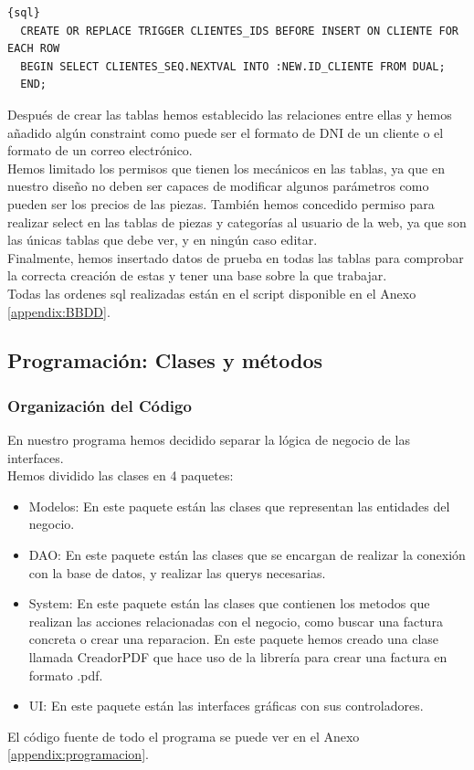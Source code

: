 \documentclass{article}
\begin{document}
{\begin{lstlisting}{sql}
  CREATE OR REPLACE TRIGGER CLIENTES_IDS BEFORE INSERT ON CLIENTE FOR EACH ROW
  BEGIN SELECT CLIENTES_SEQ.NEXTVAL INTO :NEW.ID_CLIENTE FROM DUAL;
  END;
\end{lstlisting}
Después de crear las tablas hemos establecido las relaciones entre ellas y hemos añadido algún constraint como puede ser el formato de DNI de un cliente o el formato de un correo electrónico.\\ 
Hemos limitado los permisos que tienen los mecánicos en las tablas, ya que en nuestro diseño no deben ser capaces de modificar algunos parámetros como pueden ser los precios de las piezas. También hemos concedido permiso para
realizar select en las tablas de piezas y categorías al usuario de la web, ya que son las únicas tablas que debe ver, y en ningún caso editar.\\ 
Finalmente, hemos insertado datos de prueba en todas las tablas para comprobar la correcta creación de estas y tener una base sobre la que trabajar.\\ 
Todas las ordenes sql realizadas están en el script disponible en el Anexo \ref{appendix:BBDD}.
}

\subsection{Programación: Clases y métodos}
  \subsubsection{Organización del Código}
  En nuestro programa hemos decidido separar la lógica de negocio de las interfaces.\\ 
  Hemos dividido las clases en 4 paquetes:\\
  \begin{itemize}
    \item Modelos: En este paquete están las clases que representan las entidades del negocio. 
    \item DAO: En este paquete están las clases que se encargan de realizar la conexión con la base de datos, y realizar las querys necesarias.
    \item System: En este paquete están las clases que contienen los metodos que realizan las acciones relacionadas con el negocio, como buscar una factura concreta o crear una reparacion. En este paquete hemos creado una clase llamada CreadorPDF 
    que hace uso de la librería \href{https://github.com/itext}{\color{red}{iText}} para crear una factura en formato .pdf.
    \item UI: En este paquete están las interfaces gráficas con sus controladores. 
  \end{itemize}
  El código fuente de todo el programa se puede ver en el Anexo \ref{appendix:programacion}.
\end{document}
